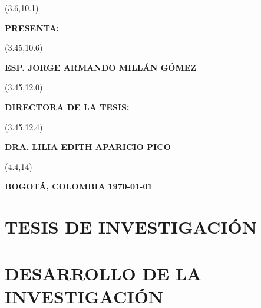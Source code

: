 \documentclass[openany,12pt,letterpaper]{book}
\begin{document}
	\begin{textblock}{12}(3.6,10.1)
		\begin{center} \textbf{PRESENTA:} \end{center}
	\end{textblock}
	
	\begin{textblock}{12}(3.45,10.6)
		\begin{center} \Large{\textbf{ESP. JORGE ARMANDO MILLÁN GÓMEZ}} \end{center}
	\end{textblock}
	
	\begin{textblock}{12}(3.45,12.0)
		\begin{center} \textbf{DIRECTORA DE LA TESIS:} \end{center}
	\end{textblock}
	
	\begin{textblock}{12}(3.45,12.4)
		\begin{center} 
			\large{\textbf{DRA. LILIA EDITH APARICIO PICO}} 
		\end{center}
	\end{textblock}
	
	\begin{textblock}{9.5}(4.4,14)
		\begin{center} \textbf{BOGOTÁ, COLOMBIA}\hspace{1in} \textbf{\today} \end{center}
	\end{textblock}
	\newpage

	
	\clearpage
	\tableofcontents
	\listoffigures
	\listoftables
	\lstlistoflistings	
	\part{TESIS DE INVESTIGACIÓN}
	
	
	
	
	\clearpage
	
	\part{DESARROLLO DE LA INVESTIGACIÓN}
	
	
\end{document}
